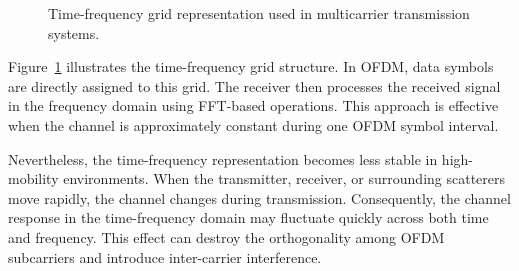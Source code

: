 \begin{figure}[H]
\centering
{}
\caption{Time-frequency grid representation used in multicarrier transmission systems.}
\label{fig:time_frequency_grid}

\end{figure}

Figure~\ref{fig:time_frequency_grid} illustrates the time-frequency grid structure. In OFDM, data symbols are directly assigned to this grid. The receiver then processes the received signal in the frequency domain using FFT-based operations. This approach is effective when the channel is approximately constant during one OFDM symbol interval.

Nevertheless, the time-frequency representation becomes less stable in high-mobility environments. When the transmitter, receiver, or surrounding scatterers move rapidly, the channel changes during transmission. Consequently, the channel response in the time-frequency domain may fluctuate quickly across both time and frequency. This effect can destroy the orthogonality among OFDM subcarriers and introduce inter-carrier interference.

